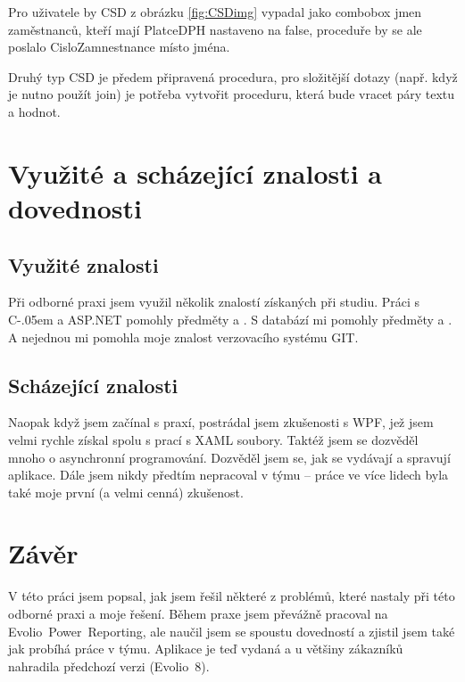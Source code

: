 \documentclass[czech,bachelorpractice,dept460,male,csharp]{diploma}
\newcommand{\EvolioEight}{Evolio~8}
\newcommand{\EFilters}{Evolio~Power~Reporting}
\newcommand{\Csharp}{%
  {\settoheight{\dimen0}{C}C\kern-.05em \resizebox{!}{\dimen0}{\raisebox{\depth}{\#}}}}
\begin{document}
			Pro uživatele by CSD z obrázku \ref{fig:CSDimg} vypadal jako combobox jmen zaměstnanců, kteří mají PlatceDPH nastaveno na false, proceduře by se ale poslalo CisloZamnestnance místo jména.
			
			Druhý typ CSD je předem připravená procedura, pro složitější dotazy (např. když je nutno použít join) je potřeba vytvořit proceduru, která bude vracet páry textu a hodnot.
			
\section{Využité a scházející znalosti a dovednosti}
	\subsection{Využité znalosti}
		Při odborné praxi jsem využil několik znalostí získaných při studiu. Práci s {\Csharp} a ASP.NET pomohly předměty  a . S databází mi pomohly předměty  a . A nejednou mi pomohla moje znalost verzovacího systému GIT.
	\subsection{Scházející znalosti}
		Naopak když jsem začínal s praxí, postrádal jsem zkušenosti s WPF, jež jsem velmi rychle získal spolu s prací s XAML soubory. Taktéž jsem se dozvěděl mnoho o asynchronní programování. Dozvěděl jsem se, jak se vydávají a spravují aplikace. Dále jsem nikdy předtím  nepracoval v týmu -- práce ve více lidech byla také moje první (a velmi cenná) zkušenost.
		
\section{Závěr}
V této práci jsem popsal, jak jsem řešil některé z problémů, které nastaly při této odborné praxi a moje řešení. Během praxe jsem převážně pracoval na {\EFilters}, ale naučil jsem se spoustu dovedností a zjistil jsem také jak probíhá práce v týmu. Aplikace je teď vydaná a u většiny zákazníků nahradila předchozí verzi ({\EvolioEight}). 

\printbibliography[title={Literatura}, heading=bibintoc]


\end{document}
